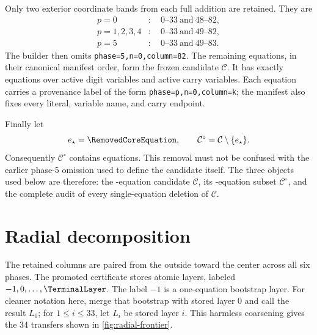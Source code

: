 \documentclass[11pt,twoside]{article}
\theoremstyle{remark}
\newcommand{\Candidate}{\ensuremath{\mathcal{C}}}
\newcommand{\Core}{\ensuremath{\mathcal{C}^{\circ}}}
\begin{document}
Only two exterior coordinate bands from each full addition are retained.
They are
\begin{align*}
  p=0 &: \quad 0\text{--}33 \ \text{and}\ 48\text{--}82,\\
  p=1,2,3,4 &: \quad 0\text{--}33 \ \text{and}\ 49\text{--}82,\\
  p=5 &: \quad 0\text{--}33 \ \text{and}\ 49\text{--}83.
\end{align*}
The builder then omits \texttt{phase=5,n=0,column=82}.  The remaining
equations, in their canonical manifest order, form the frozen candidate
$\Candidate$.  It has exactly \CandidateEquationCount{} equations over
\ActiveDigitCount{} active digit variables and \ActiveCarryCount{} active
carry variables.  Each equation carries a provenance label of the form
\texttt{phase=p,n=0,column=k}; the manifest also fixes every literal,
variable name, and carry endpoint.

Finally let
\[
  e_\star=\text{\RemovedCoreEquation},
  \qquad
  \Core=\Candidate\setminus\{e_\star\}.
\]
Consequently $\Core$ contains \CoreEquationCount{} equations.  This removal
must not be confused with the earlier phase-5 omission used to define the
candidate itself.  The three objects used below are therefore: the
\CandidateEquationCount-equation candidate $\Candidate$, its
\CoreEquationCount-equation subset $\Core$, and the complete audit of every
single-equation deletion of $\Candidate$.

\section{Radial decomposition}
\label{sec:radial-decomposition}

The retained columns are paired from the outside toward the center across all
six phases.  The promoted certificate stores \RadialLayerCount{} atomic
layers, labeled $-1,0,\ldots,\TerminalLayer$.  The label $-1$ is a
one-equation bootstrap layer.  For cleaner notation here, merge that
bootstrap with stored layer $0$ and call the result $L_0$; for
$1\leq i\leq 33$, let $L_i$ be stored layer $i$.  This harmless coarsening
gives the 34 transfers shown in \cref{fig:radial-frontier}.
\end{document}
